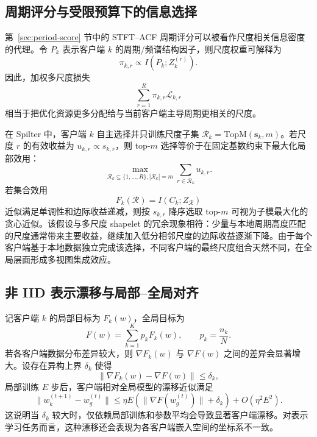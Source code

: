 \documentclass{article}
\begin{document}
\subsection{周期评分与受限预算下的信息选择}

第~\ref{sec:period-score} 节中的 STFT--ACF 周期评分可以被看作尺度相关信息密度的代理。令 $P_k$ 表示客户端 $k$ 的周期/频谱结构因子，则尺度权重可解释为
\begin{equation}
\pi_{k,r}\propto I(P_k;Z_k^{(r)}).
\end{equation}
因此，加权多尺度损失
\begin{equation}
\sum_{r=1}^{R}\pi_{k,r}\mathcal{L}_{k,r}
\end{equation}
相当于把优化资源更多分配给与当前客户端主导周期更相关的尺度。

在 Spilter 中，客户端 $k$ 自主选择并只训练尺度子集 $\mathcal{R}_k=\mathrm{TopM}(\mathbf{s}_k,m)$。若尺度 $r$ 的有效收益为 $u_{k,r}\propto s_{k,r}$，则 top-$m$ 选择等价于在固定基数约束下最大化局部效用：
\begin{equation}
\max_{\mathcal{R}_k\subseteq \{1,\ldots,R\},|\mathcal{R}_k|=m}
\sum_{r\in\mathcal{R}_k}u_{k,r}.
\label{eq:budget-scale}
\end{equation}
若集合效用
\begin{equation}
F_k(\mathcal{R})=I(C_k;Z_{\mathcal{R}})
\end{equation}
近似满足单调性和边际收益递减，则按 $s_{k,r}$ 降序选取 top-$m$ 可视为子模最大化的贪心近似。该假设与多尺度 shapelet 的冗余现象相符：少量与本地周期高度匹配的尺度通常带来主要收益，继续加入低分相邻尺度的边际收益逐渐下降。由于每个客户端基于本地数据独立完成该选择，不同客户端的最终尺度组合天然不同，在全局层面形成多视图集成效应。

\subsection{非 IID 表示漂移与局部--全局对齐}

记客户端 $k$ 的局部目标为 $F_k(w)$，全局目标为
\begin{equation}
F(w)=\sum_{k=1}^{K}p_k F_k(w),\qquad p_k=\frac{n_k}{N}.
\end{equation}
若各客户端数据分布差异较大，则 $\nabla F_k(w)$ 与 $\nabla F(w)$ 之间的差异会显著增大。设存在异构上界 $\delta_k$ 使得
\begin{equation}
\|\nabla F_k(w)-\nabla F(w)\|\leq \delta_k,
\end{equation}
局部训练 $E$ 步后，客户端相对全局模型的漂移近似满足
\begin{equation}
\|w_k^{(t+1)}-w_g^{(t)}\|
\leq \eta E\left(\|\nabla F(w_g^{(t)})\|+\delta_k\right)
 + O(\eta^2E^2).
\end{equation}
这说明当 $\delta_k$ 较大时，仅依赖局部训练和参数平均会导致显著客户端漂移\cite{fedprox,moon}。对表示学习任务而言，这种漂移还会表现为各客户端嵌入空间的坐标系不一致\cite{fedu2,fedca}。
\end{document}
